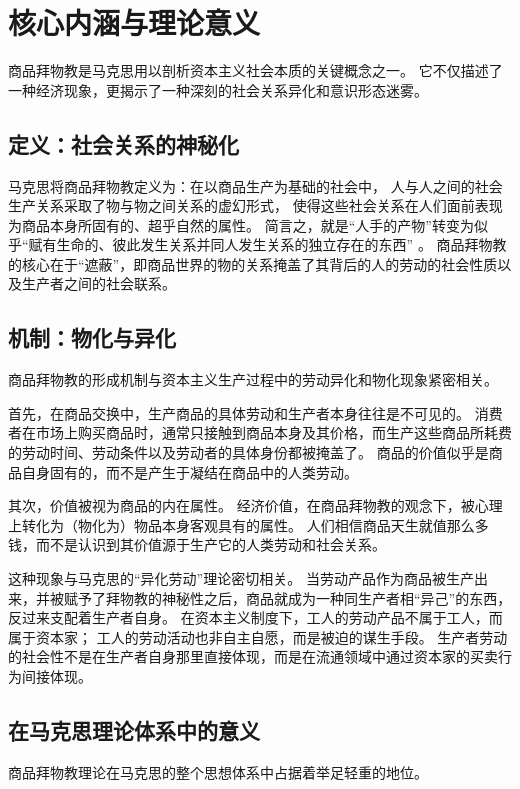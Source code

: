 \section{核心内涵与理论意义}
商品拜物教是马克思用以剖析资本主义社会本质的关键概念之一。
它不仅描述了一种经济现象，更揭示了一种深刻的社会关系异化和意识形态迷雾。
\subsection{定义：社会关系的神秘化}
马克思将商品拜物教定义为：在以商品生产为基础的社会中，
人与人之间的社会生产关系采取了物与物之间关系的虚幻形式，
使得这些社会关系在人们面前表现为商品本身所固有的、超乎自然的属性。
简言之，就是“人手的产物”转变为似乎“赋有生命的、彼此发生关系并同人发生关系的独立存在的东西” 。
商品拜物教的核心在于“遮蔽”，即商品世界的物的关系掩盖了其背后的人的劳动的社会性质以及生产者之间的社会联系\autocite{zheng2022fetishism}。
\subsection{机制：物化与异化}
商品拜物教的形成机制与资本主义生产过程中的劳动异化和物化现象紧密相关。

首先，在商品交换中，生产商品的具体劳动和生产者本身往往是不可见的。
消费者在市场上购买商品时，通常只接触到商品本身及其价格，而生产这些商品所耗费的劳动时间、劳动条件以及劳动者的具体身份都被掩盖了。
商品的价值似乎是商品自身固有的，而不是产生于凝结在商品中的人类劳动\autocite{wiki}。

其次，价值被视为商品的内在属性。
经济价值，在商品拜物教的观念下，被心理上转化为（物化为）物品本身客观具有的属性。
人们相信商品天生就值那么多钱，而不是认识到其价值源于生产它的人类劳动和社会关系。

这种现象与马克思的“异化劳动”理论密切相关。
当劳动产品作为商品被生产出来，并被赋予了拜物教的神秘性之后，商品就成为一种同生产者相“异己”的东西，反过来支配着生产者自身。
在资本主义制度下，工人的劳动产品不属于工人，而属于资本家；
工人的劳动活动也非自主自愿，而是被迫的谋生手段。
生产者劳动的社会性不是在生产者自身那里直接体现，而是在流通领域中通过资本家的买卖行为间接体现。


\subsection{在马克思理论体系中的意义}
商品拜物教理论在马克思的整个思想体系中占据着举足轻重的地位。

